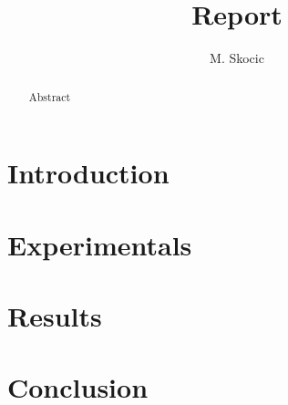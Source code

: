 \title{Report}
\author{M. Skocic}


\maketitle

\begin{abstract}
   Abstract 
\end{abstract}

\section{Introduction}


\section{Experimentals}


\section{Results}


\section{Conclusion}



